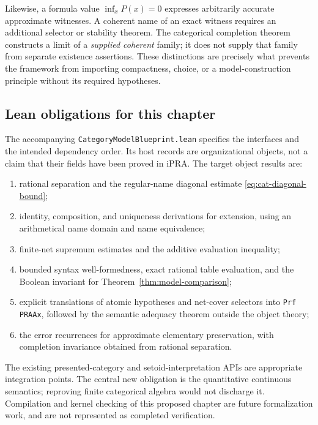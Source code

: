 Likewise, a formula value $\inf_xP(x)=0$ expresses arbitrarily accurate
approximate witnesses. A coherent name of an exact witness requires an
additional selector or stability theorem. The categorical completion theorem
constructs a limit of a \emph{supplied coherent} family; it does not supply
that family from separate existence assertions. These distinctions are
precisely what prevents the framework from importing compactness, choice,
or a model-construction principle without its required hypotheses.

\subsection{Lean obligations for this chapter}

The accompanying \texttt{CategoryModelBlueprint.lean} specifies the interfaces
and the intended dependency order. Its host records are organizational
objects, not a claim that their fields have been proved in iPRA. The target
object results are:
\begin{enumerate}
\item rational separation and the regular-name diagonal estimate
\eqref{eq:cat-diagonal-bound};
\item identity, composition, and uniqueness derivations for extension, using
an arithmetical name domain and name equivalence;
\item finite-net supremum estimates and the additive evaluation inequality;
\item bounded syntax well-formedness, exact rational table evaluation, and the
Boolean invariant for Theorem~\ref{thm:model-comparison};
\item explicit translations of atomic hypotheses and net-cover selectors into
\texttt{Prf PRAAx}, followed by the semantic adequacy theorem outside the
object theory;
\item the error recurrences for approximate elementary preservation, with
completion invariance obtained from rational separation.
\end{enumerate}
The existing presented-category and setoid-interpretation APIs are appropriate
integration points. The central new obligation is the quantitative
continuous semantics; reproving finite categorical algebra would not discharge
it. Compilation and kernel checking of this proposed chapter are future
formalization work, and are not represented as completed verification.
